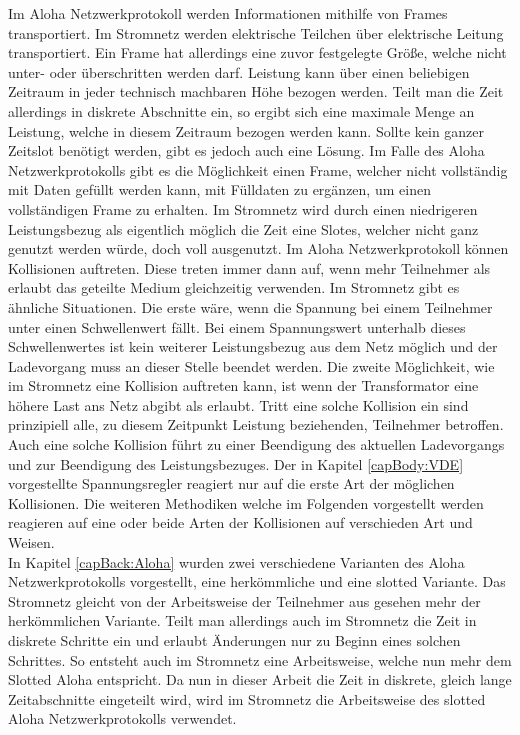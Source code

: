 Im Aloha Netzwerkprotokoll werden Informationen mithilfe von Frames transportiert. Im Stromnetz werden elektrische Teilchen über elektrische Leitung transportiert. Ein Frame hat allerdings eine zuvor festgelegte Größe, welche nicht unter- oder überschritten werden darf. Leistung kann über einen beliebigen Zeitraum in jeder technisch machbaren Höhe bezogen werden. Teilt man die Zeit allerdings in diskrete Abschnitte ein, so ergibt sich eine maximale Menge an Leistung, welche in diesem Zeitraum bezogen werden kann. Sollte kein ganzer Zeitslot benötigt werden, gibt es jedoch auch eine Lösung. Im Falle des Aloha Netzwerkprotokolls gibt es die Möglichkeit einen Frame, welcher nicht vollständig mit Daten gefüllt werden kann, mit Fülldaten zu ergänzen, um einen vollständigen Frame zu erhalten. Im Stromnetz wird durch einen niedrigeren Leistungsbezug als eigentlich möglich die Zeit eine Slotes, welcher nicht ganz genutzt werden würde, doch voll ausgenutzt. Im Aloha Netzwerkprotokoll können Kollisionen auftreten. Diese treten immer dann auf, wenn mehr Teilnehmer als erlaubt das geteilte Medium gleichzeitig verwenden. Im Stromnetz gibt es ähnliche Situationen. Die erste wäre, wenn die Spannung bei einem Teilnehmer unter einen Schwellenwert fällt. Bei einem Spannungswert unterhalb dieses Schwellenwertes ist kein weiterer Leistungsbezug aus dem Netz möglich und der Ladevorgang muss an dieser Stelle beendet werden. Die zweite Möglichkeit, wie im Stromnetz eine Kollision auftreten kann, ist wenn der Transformator eine höhere Last ans Netz abgibt als erlaubt. Tritt eine solche Kollision ein sind prinzipiell alle, zu diesem Zeitpunkt Leistung beziehenden, Teilnehmer betroffen. Auch eine solche Kollision führt zu einer Beendigung des aktuellen Ladevorgangs und zur Beendigung des Leistungsbezuges. Der in Kapitel \ref{capBody:VDE} vorgestellte Spannungsregler reagiert nur auf die erste Art der möglichen Kollisionen. Die weiteren Methodiken welche im Folgenden vorgestellt werden reagieren auf eine oder beide Arten der Kollisionen auf verschieden Art und Weisen.\\
In Kapitel \ref{capBack:Aloha} wurden zwei verschiedene Varianten des Aloha Netzwerkprotokolls vorgestellt, eine herkömmliche und eine slotted Variante. Das Stromnetz gleicht von der Arbeitsweise der Teilnehmer aus gesehen mehr der herkömmlichen Variante. Teilt man allerdings auch im Stromnetz die Zeit in diskrete Schritte ein und erlaubt Änderungen nur zu Beginn eines solchen Schrittes. So entsteht auch im Stromnetz eine Arbeitsweise, welche nun mehr dem Slotted Aloha entspricht. Da nun in dieser Arbeit die Zeit in diskrete, gleich lange Zeitabschnitte eingeteilt wird, wird im Stromnetz die Arbeitsweise des slotted Aloha Netzwerkprotokolls verwendet.

